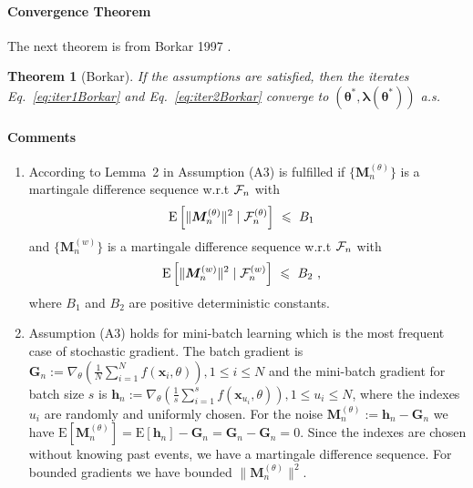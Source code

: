 \documentclass{article}
\newtheorem{theorem}{Theorem}
\newcommand\Bh{\bm{h}}
\newcommand\Bx{\bm{x}}
\newcommand\BG{\bm{G}}
\newcommand\BM{\bm{M}}
\newcommand\Bla{\bm{\lambda}}
\newcommand\Bth{\bm{\theta}}
\newcommand{\rE}{\mathrm{E}} \newcommand{\rF}{\mathrm{F}}
\renewcommand{\leq}{\leqslant}
\begin{document}
\paragraph{Convergence Theorem}

The next theorem is from Borkar 1997 \cite{Borkar:97}.
\begin{theorem}[Borkar]
\label{th:borkar}
If the assumptions are satisfied,
then the iterates Eq.~\eqref{eq:iter1Borkar} and Eq.~\eqref{eq:iter2Borkar}
converge to $(\Bth^{*}, \Bla(\Bth^{*}))$ a.s.
\end{theorem}


\paragraph{Comments}
\begin{enumerate}[label=\textbf{(C\arabic*)}]
\item
According to Lemma~2 in \cite{Bertsekas:00} Assumption (A3)
is fulfilled if
$\{\BM^{(\theta)}_n\}$ is a martingale difference sequence
w.r.t $\mathcal{F}_n$ with
\begin{align} \nonumber
\rE \left[\|\BM^{(\theta)}_n \|^2 \mid \cF_n^{(\theta)} \right]
  \ &\leq \ B_1
\end{align} and
$\{\BM^{(w)}_n\}$ is a martingale difference sequence
w.r.t  $\mathcal{F}_n$ with
\begin{align} \nonumber
\rE \left[\|\BM^{(w)}_n \|^2 \mid \cF_n^{(w)} \right]
  \ &\leq \ B_2 \ ,
\end{align}
where $B_1$ and $B_2$ are positive deterministic constants.
\item
Assumption (A3) holds for mini-batch learning which is the most
frequent case of stochastic gradient.
The batch gradient is
$\BG_{n}:=\nabla_{\theta} (\frac{1}{N} \sum_{i=1}^{N}
f(\Bx_i,\theta)), 1 \leq i \leq N$ and
the mini-batch gradient for batch size $s$ is
$\Bh_{n}:=\nabla_{\theta} (\frac{1}{s} \sum_{i=1}^{s}
f(\Bx_{u_i},\theta)), 1 \leq u_i \leq N$, where the indexes $u_i$
are randomly and uniformly chosen.
For the noise $\BM^{(\theta)}_{n}:=\Bh_{n}-\BG_{n}$ we have
$\rE[\BM^{(\theta)}_{n}]=\rE[\Bh_{n}]-\BG_{n}=\BG_{n}-\BG_{n}=0$.
Since the indexes are chosen without knowing past events,
we have a martingale difference sequence.
For bounded gradients we have bounded $\|\BM^{(\theta)}_n \|^2$.


\end{enumerate}
\end{document}
